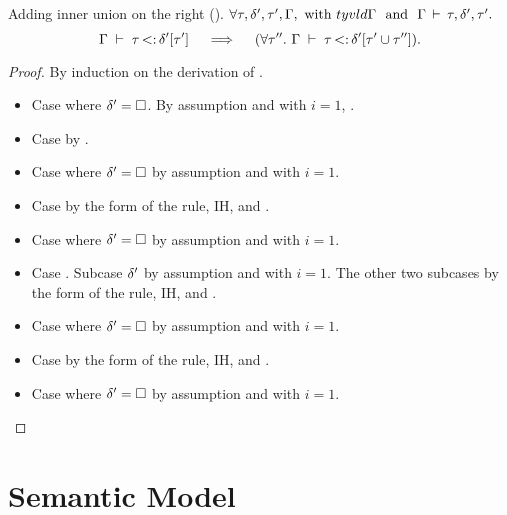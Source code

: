 \begin{lemma}{Adding inner union on the right (\textbf{\lemref{}}).}%
\label{lem:add-inner-union-right:app}
    $\forall \tau, \delta', \tau', \Gamma, \text{ with }
    tyvld{}{\Gamma}\ \text{ and }\ \Gamma\,\vdash\,\tau, \delta', \tau'.$
    \[
        \subtydflt{\ty}{\plug{\dctx'}{\ty'}}
        \quad\implies\quad
        (\forall \ty''.\ \subtydflt{\ty}{\plug{\dctx'}{\tyunion{\ty'}{\ty''}}}).
    \]
\end{lemma}
\begin{proof}
    By induction on the derivation of
    .
    \begin{itemize}
        \item Case  where $\delta'=\square$. By assumption
            \subtydflt{\ty}{\tyany} and  with $i=1$,
            .
        \item Case  by .
        \item Case  where $\delta'=\square$
            by assumption and  with $i=1$.
        \item Case  by the form of the rule, IH, and .
        \item Case  where $\delta'=\square$
            by assumption and  with $i=1$.
        \item Case . 
            Subcase $\delta'$ by assumption and  with $i=1$.
            The other two subcases by the form of the rule, IH, and .
        \item Case  where $\delta'=\square$
            by assumption and  with $i=1$.
        \item Case  by the form of the rule, IH, and .
        \item Case  where $\delta'=\square$
            by assumption and  with $i=1$.
    \end{itemize}
\end{proof}

\clearpage
\section{Semantic Model}\label{sec:app:sem-sub}

